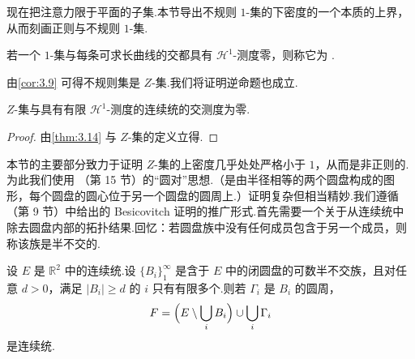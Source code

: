 现在把注意力限于平面的子集.本节导出不规则 $1$-集的下密度的一个本质的上界，从而刻画正则与不规则 $1$-集.

若一个 $1$-集与每条可求长曲线的交都具有 $\mathcal{H}^1$-测度零，则称它为 .

由\cref{cor:3.9} 可得不规则集是 $Z$-集.我们将证明逆命题也成立.

\begin{lemma}\label{lem:3.20}
$Z$-集与具有有限 $\mathcal{H}^1$-测度的连续统的交测度为零.
\end{lemma}

\begin{proof}
由\cref{thm:3.14} 与 $Z$-集的定义立得.
\end{proof}

本节的主要部分致力于证明 $Z$-集的上密度几乎处处严格小于 $1$，从而是非正则的.为此我们使用 \textcite{besicovitch1938}（第 15 节）的``圆对''思想.（是由半径相等的两个圆盘构成的图形，每个圆盘的圆心位于另一个圆盘的圆周上.）证明复杂但相当精妙.我们遵循 \textcite{morserandolph1944}（第 9 节）中给出的 Besicovitch 证明的推广形式.首先需要一个关于从连续统中除去圆盘内部的拓扑结果.回忆：若圆盘族中没有任何成员包含于另一个成员，则称该族是半不交的.

\begin{lemma}\label{lem:3.21}
设 $E$ 是 $\mathbb{R}^2$ 中的连续统.设 $\{B_i\}_{1}^{\infty}$ 是含于 $E$ 中的闭圆盘的可数半不交族，且对任意 $d>0$，满足 $|B_i|\geq d$ 的 $i$ 只有有限多个.则若 $\Gamma_i$ 是 $B_i$ 的圆周，
\[
  F=\Bigl(E\setminus\bigcup_{i}B_i\Bigr)\cup\bigcup_{i}\Gamma_i
\]
是连续统.
\end{lemma}

